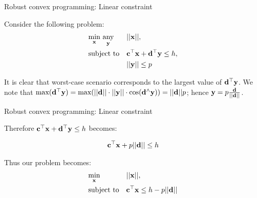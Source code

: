 \documentclass{beamer}
\begin{document}
\begin{frame}{Robust convex programming: Linear constraint}
\begin{flushleft}

Consider the following problem:
%
\begin{equation}
\begin{aligned}
& \underset{\mathbf{x}}{\text{min}} \ \underset{\mathbf{y}}{\text{any}}
& & ||\mathbf{x}||, \\
& \text{subject to}
& & \mathbf{c}^\top \mathbf{x} + \mathbf{d}^\top \mathbf{y} \leq h, \\
& & & ||\mathbf{y}|| \leq p
\end{aligned}
\end{equation}

It is clear that worst-case scenario corresponds to the largest value of $\mathbf{d}^\top \mathbf{y}$. We note that $\text{max}(\mathbf{d}^\top \mathbf{y}) = \text{max}(||\mathbf{d}|| \cdot ||\mathbf{y}|| \cdot \text{cos}(\mathbf{d}^\wedge \mathbf{y})) =  ||\mathbf{d}|| p$; hence $\mathbf{y} =  p \frac{\mathbf{d}}{|| \mathbf{d} ||} $.

 
\end{flushleft}
\end{frame}



\begin{frame}{Robust convex programming: Linear constraint}
\begin{flushleft}

Therefore $\mathbf{c}^\top \mathbf{x} + \mathbf{d}^\top \mathbf{y} \leq h$ becomes:

\begin{align}
    \mathbf{c}^\top \mathbf{x} + p || \mathbf{d} || \leq h 
\end{align}

\bigskip

Thus our problem becomes:
%
\begin{equation}
\begin{aligned}
& \underset{\mathbf{x}}{\text{min}}
& & ||\mathbf{x}||, \\
& \text{subject to}
& & \mathbf{c}^\top \mathbf{x} \leq h - p || \mathbf{d} ||
\end{aligned}
\end{equation}
 
\end{flushleft}
\end{frame}
\end{document}
